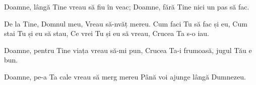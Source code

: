 
\beginverse
Doamne, lângă Tine vreau să fiu în veac;
Doamne, fără Tine nici un pas să fac.
\endverse

\beginchorus
De la Tine, Domnul meu,
Vreau să-nvăț mereu.
Cum faci Tu să fac și eu,
Cum stai Tu și eu să stau,
Ce vrei Tu și eu să vreau,
Crucea Ta s-o iau.
\endchorus

\beginverse
Doamne, pentru Tine viața vreau să-mi pun,
Crucea Ta-i frumoasă, jugul Tău e bun.
\endverse

\beginverse
Doamne, pe-a Ta cale vreau să merg mereu
Până voi ajunge lângă Dumnezeu.
\endverse

\endsong